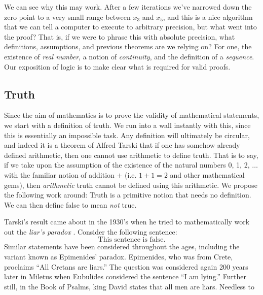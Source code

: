     We can see why this may work. After a few iterations we've narrowed down the
    zero point to a very small range between $x_{3}$ and $x_{5}$, and this is a
    nice algorithm that we can tell a computer to execute to arbitrary
    precision, but what went into the proof? That is, if we were to phrase this
    with absolute precision, what definitions, assumptions, and previous
    theorems are we relying on? For one, the existence of \textit{real number},
    a notion of \textit{continuity}, and the definition of a \textit{sequence}.
    Our exposition of logic is to make clear what is required for valid proofs.
    \subsection{Truth}
        Since the aim of mathematics is to prove the validity of mathematical
        statements, we start with a definition of truth. We run into a wall
        instantly with this, since this is essentially an impossible task. Any
        definition will ultimately be circular, and indeed it is a theorem of
        Alfred Tarski that if one has somehow already
        defined arithmetic, then one cannot use arithmetic to define truth. That
        is to say, if we take upon the assumption of the existence of the
        natural numbers 0, 1, 2, $\dots$ with the familiar notion of addition
        $+$ (i.e. $1+1=2$ and other mathematical gems), then \textit{arithmetic}
        truth cannot be defined using this arithmetic. We propose the following
        work around: Truth is a primitive notion that needs no definition. We
        can then define false to mean \textit{not} true.
        \par\hfill\par
        Tarski's result came about in the 1930's when he tried to mathematically
        work out the \textit{liar's paradox}%
        . Consider the following sentence:
        \begin{equation}
            \text{This sentence is false.}
        \end{equation}
        Similar statements have been considered throughout the ages, including
        the variant known as Epimenides' paradox.
        Epimenides, who was from Crete, proclaims ``All Cretans are liars.''
        The question was considered again 200 years later in Miletus when
        Eubulides considered the sentence ``I am lying.'' Further still, in the
        Book of Psalms, king David states that all men are liars. Needless to
